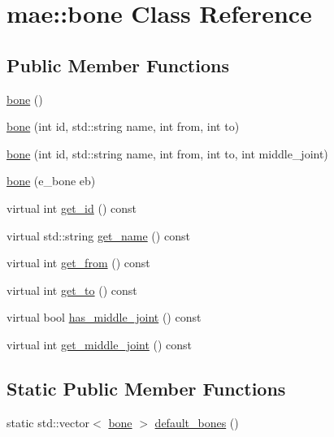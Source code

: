 \hypertarget{classmae_1_1bone}{\section{mae\-:\-:bone Class Reference}
\label{classmae_1_1bone}
}
\subsection*{Public Member Functions}
\begin{DoxyCompactItemize}
\item 
\hyperlink{classmae_1_1bone_a14db84db76d3e63c5c79c9dfa9d1cef0}{bone} ()
\item 
\hyperlink{classmae_1_1bone_a561ff970028f3663ae9cf4fbba7adcd6}{bone} (int id, std\-::string name, int from, int to)
\item 
\hyperlink{classmae_1_1bone_af18795cbd5a5394b5317d7e4a8878ef3}{bone} (int id, std\-::string name, int from, int to, int middle\-\_\-joint)
\item 
\hyperlink{classmae_1_1bone_a53ddd0ed2b97fb1d1263882b4b4ad432}{bone} (e\-\_\-bone eb)
\item 
virtual int \hyperlink{classmae_1_1bone_a5d2e2393dd57957ff28d29697bea0249}{get\-\_\-id} () const 
\item 
virtual std\-::string \hyperlink{classmae_1_1bone_aae7a08cddc8003110683412673208983}{get\-\_\-name} () const 
\item 
virtual int \hyperlink{classmae_1_1bone_ab67f78b8888f6a93fafcf90184189f86}{get\-\_\-from} () const 
\item 
virtual int \hyperlink{classmae_1_1bone_a941a84495e83fd2e03346213cb720caa}{get\-\_\-to} () const 
\item 
virtual bool \hyperlink{classmae_1_1bone_a6352164d54e3eec7cd2a398c33dcca3c}{has\-\_\-middle\-\_\-joint} () const 
\item 
virtual int \hyperlink{classmae_1_1bone_a7f468c1bfe33063c40aed4a2377f7c2b}{get\-\_\-middle\-\_\-joint} () const 
\end{DoxyCompactItemize}
\subsection*{Static Public Member Functions}
\begin{DoxyCompactItemize}
\item 
static std\-::vector$<$ \hyperlink{classmae_1_1bone}{bone} $>$ \hyperlink{classmae_1_1bone_a2d1dc38188f1eced8fdcfd787337286f}{default\-\_\-bones} ()
\end{DoxyCompactItemize}
